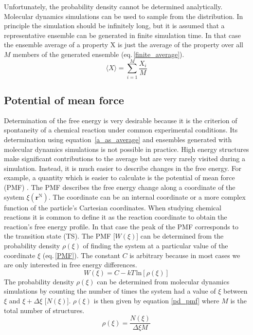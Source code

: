 Unfortunately, the probability density cannot be determined analytically. Molecular dynamics simulations can be used to sample from the distribution. In principle the simulation should be infinitely long, but it is assumed that a representative ensemble can be generated in finite simulation time. In that case the ensemble average of a property X is just the average of the property over all $M$ members of the generated ensemble (eq.\,\ref{finite_average}).
\begin{equation} \label{finite_average}
    \langle X \rangle = \sum_{i=1}^{M} \frac{X_i}{M}
\end{equation}

\subsection{Potential of mean force}
Determination of the free energy is very desirable because it is the criterion of spontaneity of a chemical reaction under common experimental conditions. Its determination using equation~\ref{a_as_average} and ensembles generated with molecular dynamics simulations is not possible in practice. High energy structures make significant contributions to the average but are very rarely visited during a simulation. Instead, it is much easier to describe changes in the free energy. For example, a quantity which is easier to calculate is the potential of mean force (PMF) \cite{Roux1995}. The PMF describes the free energy change along a coordinate of the system $\xi(\mathbf{r}^{\text{N}})$. The coordinate can be an internal coordinate or a more complex function of the particle's Cartesian coordinates. When studying chemical reactions it is common to define it as the reaction coordinate to obtain the reaction's free energy profile. In that case the peak of the PMF corresponds to the transition state (TS). The PMF [$W(\xi)$] can be determined from the probability density $\rho(\xi)$ of finding the system at a particular value of the coordinate $\xi$ (eq.\,\ref{PMF}). The constant $C$ is arbitrary because in most cases we are only interested in free energy differences.
\begin{equation} \label{PMF}
    W(\xi) = C      - kT \, \text{ln}[\rho(\xi)]
\end{equation}
The probability density $\rho(\xi)$ can be determined from molecular dynamics simulations by counting the number of times the system had a value of $\xi$ between $\xi$ and $\xi + \Delta \xi$ [$N(\xi)$]. $\rho(\xi)$ is then given by equation \ref{pd_pmf} where $M$ is the total number of structures.
\begin{equation} \label{pd_pmf}
    \rho(\xi) = \frac{N(\xi)}{\Delta \xi M}
\end{equation}

